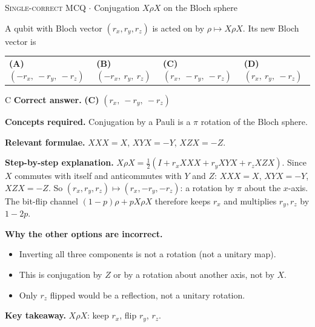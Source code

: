 \documentclass[11pt,a4paper]{article}
\newcommand{\optlabel}[1]{\textbf{(#1)}}
\newcommand{\correctlabel}[1]{\textcolor{okgreen}{\textbf{(#1)}\,\ding{51}}}
\newenvironment{qitem}[1]{\begin{list}{}{\setlength{\leftmargin}{3.3em}\setlength{\labelwidth}{3.1em}%
  \setlength{\labelsep}{0.2em}\setlength{\topsep}{3pt}\setlength{\parsep}{3pt}}\item[\textbf{Q.#1}\hfill]}{\end{list}}
\newcommand{\qsep}{\par\vspace{2pt}{\color{black!15}\hrule}\vspace{4pt}}
\newcommand{\qmeta}[2]{{\footnotesize\color{black!60}\textsc{#1} \;$\cdot$\; #2}\par}
\begin{document}
\begin{qitem}{14}
\qmeta{Single-correct MCQ}{Conjugation $X\rho X$ on the Bloch sphere}
A qubit with Bloch vector $(r_x, r_y, r_z)$ is acted on by $\rho \mapsto X\rho X$. Its new Bloch vector is
\par\smallskip\noindent\begin{tabularx}{\linewidth}{@{}*{4}{L}@{}}
\optlabel{A}\,$(-r_x,\ -r_y,\ -r_z)$ & \optlabel{B}\,$(-r_x,\ r_y,\ r_z)$ & \correctlabel{C}\,$(r_x,\ -r_y,\ -r_z)$ & \optlabel{D}\,$(r_x,\ r_y,\ -r_z)$
\end{tabularx}
\end{qitem}
\begin{solbox}{C}
\textbf{\color{brand}Correct answer.} \textcolor{okgreen}{\textbf{(C)}} $(r_x,\ -r_y,\ -r_z)$

\textbf{\color{brand}Concepts required.} Conjugation by a Pauli is a $\pi$ rotation of the Bloch sphere.

\textbf{\color{brand}Relevant formulae.} $XXX = X$, $XYX = -Y$, $XZX = -Z$.

\textbf{\color{brand}Step-by-step explanation.} $X\rho X = \frac12(I + r_xXXX + r_yXYX + r_zXZX)$. Since $X$ commutes with itself and anticommutes with $Y$ and $Z$:
$XXX = X$, $XYX = -Y$, $XZX = -Z$. So $(r_x, r_y, r_z) \mapsto (r_x, -r_y, -r_z)$: a rotation by $\pi$ about the $x$-axis.
The bit-flip channel $(1 - p)\rho + pX\rho X$ therefore keeps $r_x$ and multiplies $r_y, r_z$ by $1 - 2p$.

\textbf{\color{brand}Why the other options are incorrect.}
\begin{itemize}[leftmargin=2.4em, itemsep=1pt, topsep=2pt]
\item[\textbf{(A)}] Inverting all three components is not a rotation (not a unitary map).
\item[\textbf{(B)}] This is conjugation by $Z$ or by a rotation about another axis, not by $X$.
\item[\textbf{(D)}] Only $r_z$ flipped would be a reflection, not a unitary rotation.
\end{itemize}
\textbf{\color{brand}Key takeaway.} $X\rho X$: keep $r_x$, flip $r_y$, $r_z$.
\end{solbox}
\qsep
\end{document}
